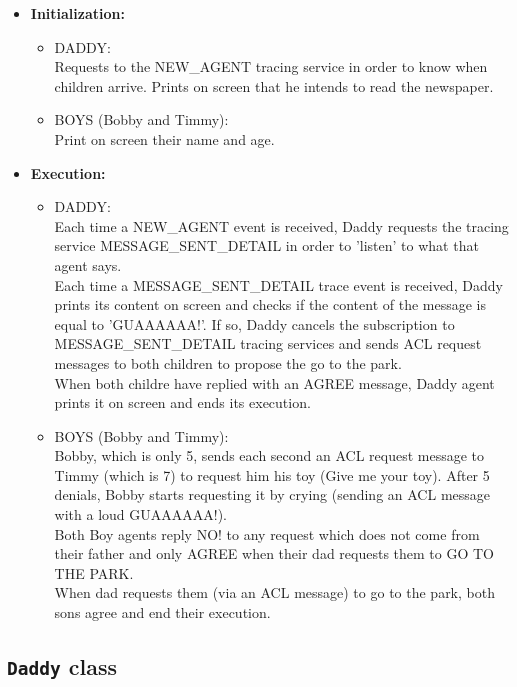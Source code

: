 	\begin{itemize}
		\item\textbf{Initialization:}
			\begin{itemize}
				\item DADDY:\\
					Requests to the NEW\_AGENT tracing service in order to know when
					children arrive. Prints on screen that he intends to read the newspaper.

				\item BOYS (Bobby and Timmy):\\
					Print on screen their name and age.
			\end{itemize}

		\item\textbf{Execution:}
			\begin{itemize}
				\item DADDY:\\
					Each time a NEW\_AGENT event is received, Daddy requests the tracing
					service MESSAGE\_SENT\_DETAIL in order to 'listen' to what that agent
					says.\\
					Each time a MESSAGE\_SENT\_DETAIL trace event is received, Daddy
					prints its content on screen and checks if the content of the message is equal
					to 'GUAAAAAA!'. If so, Daddy cancels the subscription to
					MESSAGE\_SENT\_DETAIL tracing services and sends ACL request
					messages to both children to propose the go to the park.\\
					When both childre have replied with an AGREE message, Daddy agent
					prints it on screen and ends its execution.

				\item BOYS (Bobby and Timmy):\\
					Bobby, which is only 5, sends each second an ACL request message to
					Timmy (which is 7) to request him his toy (Give me your toy). After 5 denials,
					Bobby starts requesting it by crying (sending an ACL message with a loud
					GUAAAAAA!).\\
					Both Boy agents reply NO! to any request which does not come from their
					father and only AGREE when their dad requests them to GO TO THE
					PARK.\\
					When dad requests them (via an ACL message) to go to the park, both sons
					agree and end their execution.
			\end{itemize}
	\end{itemize}

	\subsection{\texttt{Daddy} class}\label{sec:daddy}

